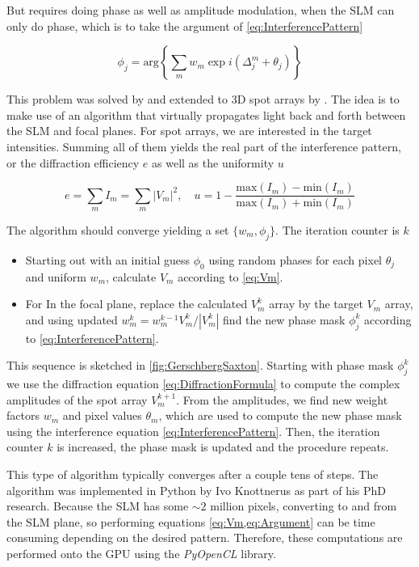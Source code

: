 But requires doing phase as well as amplitude modulation, when the SLM can only do phase, which is to take the argument of \cref{eq:InterferencePattern}

\begin{equation}\label{eq:Argument}
    \phi_j = \text{arg}\left\{
     \sum_m w_m \exp{
    i\left(\Delta_j^m + \theta_j\right)
    }
    \right\}
\end{equation}

This problem was solved by \cite{Gerschberg1972} and extended to 3D spot arrays by \cite{DiLeonardo2007}. The idea is to make use of an algorithm that virtually propagates light back and forth between the SLM and focal planes. For spot arrays, we are interested in the target intensities. Summing all of them yields the real part of the interference pattern, or the diffraction efficiency $e$ as well as the uniformity $u$

\begin{equation}
    e = \sum_m I_m = \sum_m |V_m|^2, 
    \quad 
    u = 1-\frac{\text{max}(I_m)-\text{min}(I_m)}{\text{max}(I_m)+\text{min}(I_m)}
\end{equation}

The algorithm should converge yielding a set $\{w_m, \phi_j\}$. The iteration counter is $k$

\begin{itemize}
    \item Starting out with an initial guess $\phi_0$ using random phases for each pixel $\theta_j$ and uniform $w_m$, calculate $V_m$ according to \cref{eq:Vm}. 
    
    \item For In the focal plane, replace the calculated $V_m^k$ array by the target $V_m$ array, and using updated $w_m^k = w_m^{k-1} V_m^k / |V_m^k|$ find the new phase mask $\phi_j^k$ according to \cref{eq:InterferencePattern}.
\end{itemize}

This sequence is sketched in \cref{fig:GerschbergSaxton}. Starting with phase mask $\phi_j^k$ we use the diffraction equation \cref{eq:DiffractionFormula} to compute the complex amplitudes of the spot array $V_m^{k+1}$. From the amplitudes, we find new weight factors $w_m$ and pixel values $\theta_m$, which are used to compute the new phase mask using the interference equation \cref{eq:InterferencePattern}. Then, the iteration counter $k$ is increased, the phase mask is updated and the procedure repeats. 

This type of algorithm typically converges after a couple tens of steps. The algorithm was implemented in Python by Ivo Knottnerus as part of his PhD research. Because the SLM has some $\sim 2$ million pixels, converting to and from the SLM plane, so performing equations  \cref{eq:Vm,eq:Argument} can be time consuming depending on the desired pattern. Therefore, these computations are performed onto the GPU using the \textit{PyOpenCL} library. 

